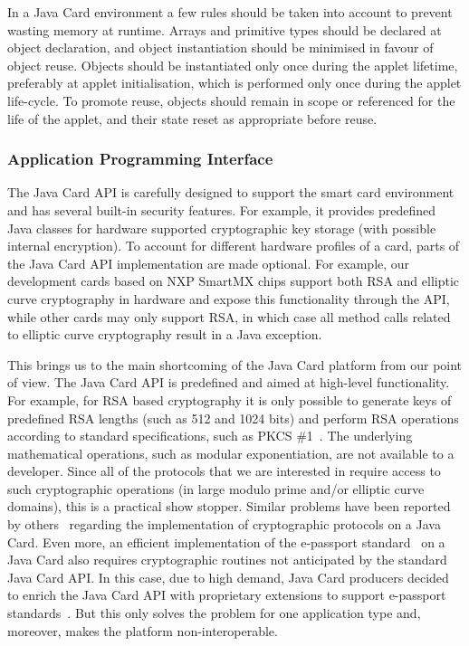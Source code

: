 In a Java Card environment a few rules should be taken into account to prevent
wasting memory at runtime. Arrays and primitive types should be declared at
object declaration, and object instantiation should be minimised in favour of
object reuse. Objects should be instantiated only once during the applet
lifetime, preferably at applet initialisation, which is performed only once
during the applet life-cycle. To promote reuse, objects should remain in scope
or referenced for the life of the applet, and their state reset as appropriate
before reuse.

\subsubsection{Application Programming Interface}

The Java Card API is carefully designed to support the
smart card environment and has several built-in security features. For example,
it provides predefined Java classes for hardware supported cryptographic key
storage (with possible internal encryption). To account for different hardware
profiles of a card, parts of the Java Card API implementation are made optional.
For example, our development cards based on NXP SmartMX chips support both RSA
 and elliptic curve cryptography in hardware and expose this functionality through the API, while
other cards may only support RSA, in which case all method calls related to
elliptic curve cryptography result in a Java exception.

This brings us to the main shortcoming of the Java Card platform from our point
of view. The Java Card API is predefined and aimed at high-level functionality.
For example, for RSA based cryptography it is only possible to generate keys of
predefined RSA lengths (such as 512 and 1024 bits) and perform RSA operations
according to standard specifications, such as PKCS \#1~\cite{PKCS_1}. The
underlying mathematical operations, such as modular exponentiation, are not
available to a developer. Since all of the protocols that we are interested in
require access to such cryptographic operations (in large modulo prime and/or
elliptic curve domains), this is a practical show stopper. Similar problems have
been reported by others~\cite{Sterckx09} regarding the implementation of
cryptographic protocols on a Java Card. Even more, an efficient implementation
of the e-passport standard~\cite{EAC20} on a Java Card also requires
cryptographic routines not anticipated by the standard Java Card API. In this
case, due to high demand, Java Card producers decided to enrich the Java Card
API with proprietary extensions to support e-passport standards~\cite{NXP09}.
But this only solves the problem for one application type and, moreover, makes
the platform non-interoperable.

